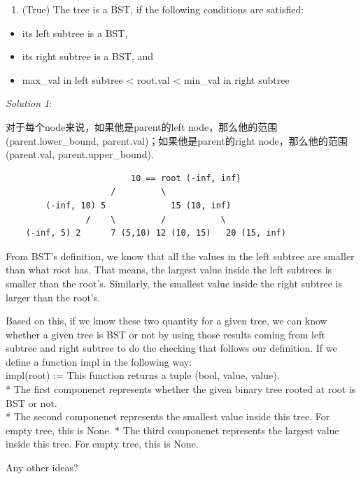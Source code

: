 \documentclass[11pt]{article}
\providecommand{\tightlist}{%
      \setlength{\itemsep}{0pt}\setlength{\parskip}{0pt}}
\begin{document}
\begin{enumerate}
\def\labelenumi{\arabic{enumi}.}
\setcounter{enumi}{3}
\tightlist
\item
  (True) The tree is a BST, if the following conditions are satisfied:
\end{enumerate}

\begin{itemize}
\tightlist
\item
  its left subtree is a BST,
\item
  its right subtree is a BST, and
\item
  max\_val in left subtree \textless{} root.val \textless{} min\_val in
  right subtree
\end{itemize}

\emph{Solution 1}:

对于每个node来说，如果他是parent的left
node，那么他的范围(parent.lower\_bound,
parent.val)；如果他是parent的right node，那么他的范围(parent.val,
parent.upper\_bound).

\begin{verbatim}
                         10 == root (-inf, inf)
                     /         \
        (-inf, 10) 5             15 (10, inf)
                /    \         /           \ 
    (-inf, 5) 2      7 (5,10) 12 (10, 15)   20 (15, inf)
\end{verbatim}

From BST's definition, we know that all the values in the left subtree
are smaller than what root has. That means, the largest value inside the
left subtrees is smaller than the root's. Similarly, the smallest value
inside the right subtree is larger than the root's.

Based on this, if we know these two quantity for a given tree, we can
know whether a given tree is BST or not by using those results coming
from left subtree and right subtree to do the checking that follows our
definition. If we define a function impl in the following way:\\
impl(root) := This function returns a tuple (bool, value, value).\\
* The first componenet represents whether the given binary tree rooted
at root is BST or not.\\
* The second componenet represents the smallest value inside this tree.
For empty tree, this is None. * The third componenet represents the
largest value inside this tree. For empty tree, this is None.

Any other ideas?
\end{document}
